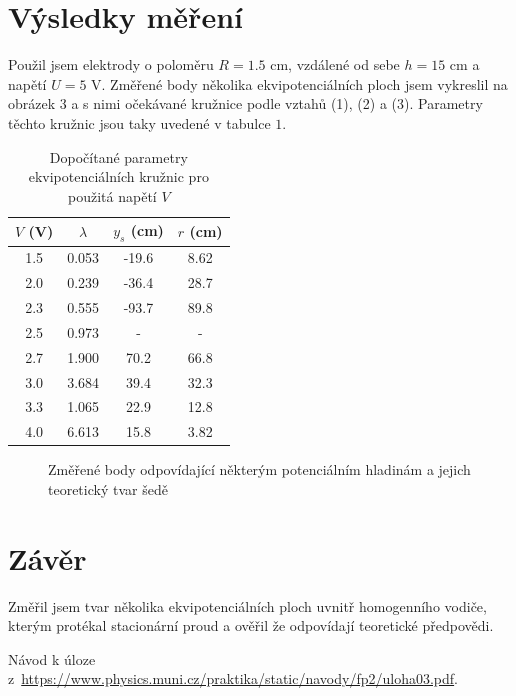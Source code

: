 \documentclass[a4paper,11pt]{article}
\begin{document}
\newpage

\section{Výsledky měření}

Použil jsem elektrody o poloměru $ R = 1.5 $ cm, vzdálené od sebe $ h = 15 $ cm a napětí $ U = 5 $ V. Změřené body několika ekvipotenciálních ploch jsem vykreslil na obrázek 3 a s nimi očekávané kružnice podle vztahů (1), (2) a (3). Parametry těchto kružnic jsou taky uvedené v tabulce $ 1 $.

\begin{table}[htpb]
    \centering
    \begin{tabular}{c c c c}
        \hline\hline
        $ V $ (V) & $ \lambda $ & $ y_s $ (cm) & $ r $ (cm) \\ 
        \hline
        1.5 & 0.053 & -19.6 & 8.62 \\
        2.0 & 0.239 & -36.4 & 28.7 \\
        2.3 & 0.555 & -93.7 & 89.8 \\
        2.5 & 0.973 &   -   &  -   \\
        2.7 & 1.900 &  70.2 & 66.8 \\
        3.0 & 3.684 &  39.4 & 32.3 \\
        3.3 & 1.065 &  22.9 & 12.8 \\
        4.0 & 6.613 &  15.8 & 3.82 \\
        \hline\hline
    \end{tabular}
    \caption{Dopočítané parametry ekvipotenciálních kružnic pro použitá napětí $ V $ }
\end{table}

\begin{figure}[htpb]
    \centering
    
    \caption{Změřené body odpovídající některým potenciálním hladinám a jejich teoretický tvar šedě }
\end{figure}

\section{Závěr}

Změřil jsem tvar několika ekvipotenciálních ploch uvnitř homogenního vodiče, kterým protékal stacionární proud a ověřil že odpovídají teoretické předpovědi. 

\begin{thebibliography}{0}
 Návod k úloze z~\url{https://www.physics.muni.cz/praktika/static/navody/fp2/uloha03.pdf}.   
\end{thebibliography}
\end{document}
